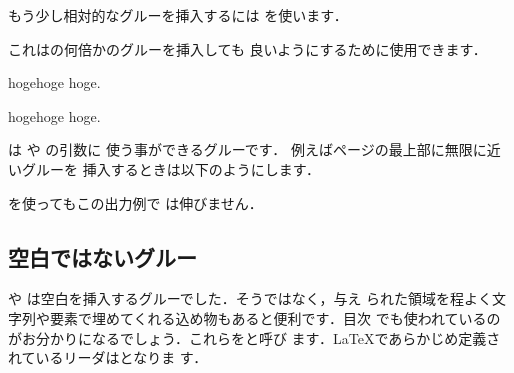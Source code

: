 もう少し相対的なグルーを挿入するには
を使います．
\begin{Syntax}
\end{Syntax}
これはの何倍かのグルーを挿入しても
良いようにするために使用できます．
\begin{InOut}
hogehoge%
hoge.\par
hoge\hspace{\fill}hoge\hspace{\fill}
hoge.\par
\end{InOut}
は や の引数に
使う事ができるグルーです．
例えばページの最上部に無限に近いグルーを
挿入するときは以下のようにします．
\begin{InOut}
\vspace*{\fill}を使ってもこの出力例で
は伸びません．
\end{InOut}

\subsection{空白ではないグルー}
や は空白を挿入するグルーでした．そうではなく，与え
られた領域を程よく文字列や要素で埋めてくれる込め物もあると便利です．目次
でも使われているのがお分かりになるでしょう．これらを{}と呼び
ます．{\LaTeX}であらかじめ定義されているリーダはとなりま
す．


